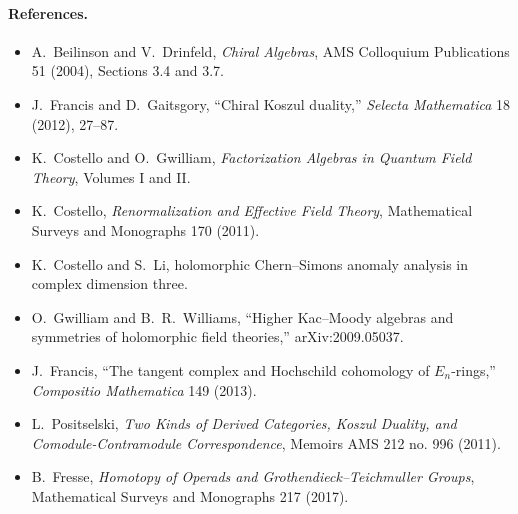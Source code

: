 \paragraph{References.}
\begin{itemize}
  \item A.~Beilinson and V.~Drinfeld, \emph{Chiral Algebras}, AMS
    Colloquium Publications 51 (2004), Sections 3.4 and 3.7.
  \item J.~Francis and D.~Gaitsgory, ``Chiral Koszul duality,''
    \emph{Selecta Mathematica} 18 (2012), 27--87.
  \item K.~Costello and O.~Gwilliam, \emph{Factorization Algebras in
    Quantum Field Theory}, Volumes I and II.
  \item K.~Costello, \emph{Renormalization and Effective Field Theory},
    Mathematical Surveys and Monographs 170 (2011).
  \item K.~Costello and S.~Li, holomorphic Chern--Simons anomaly
    analysis in complex dimension three.
  \item O.~Gwilliam and B.~R.~Williams, ``Higher Kac--Moody algebras
    and symmetries of holomorphic field theories,'' arXiv:2009.05037.
  \item J.~Francis, ``The tangent complex and Hochschild cohomology of
    \(E_n\)-rings,'' \emph{Compositio Mathematica} 149 (2013).
  \item L.~Positselski, \emph{Two Kinds of Derived Categories, Koszul
    Duality, and Comodule-Contramodule Correspondence}, Memoirs AMS 212
    no. 996 (2011).
  \item B.~Fresse, \emph{Homotopy of Operads and
    Grothendieck--Teichmuller Groups}, Mathematical Surveys and
    Monographs 217 (2017).
\end{itemize}
